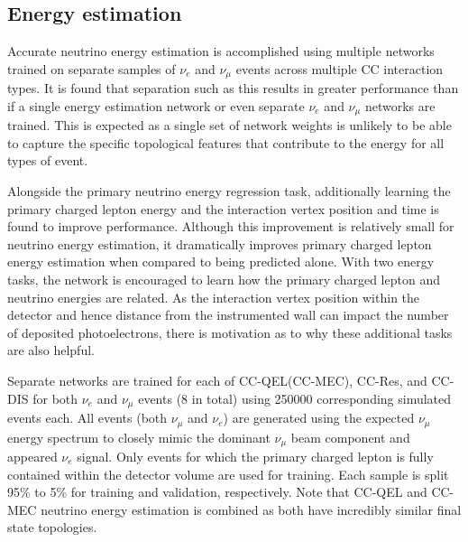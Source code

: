 \subsection{Energy estimation} %
\label{sec:cnn_specific_energy} %

Accurate neutrino energy estimation is accomplished using multiple networks trained on separate
samples of $\nu_{e}$ and $\nu_{\mu}$ events across multiple CC interaction types. It is found that
separation such as this results in greater performance than if a single energy estimation network
or even separate $\nu_{e}$ and $\nu_{\mu}$ networks are trained. This is expected as a single set
of network weights is unlikely to be able to capture the specific topological features that
contribute to the energy for all types of event.

Alongside the primary neutrino energy regression task, additionally learning the primary charged
lepton energy and the interaction vertex position and time is found to improve performance.
Although this improvement is relatively small for neutrino energy estimation, it dramatically
improves primary charged lepton energy estimation when compared to being predicted alone. With two
energy tasks, the network is encouraged to learn how the primary charged lepton and neutrino
energies are related. As the interaction vertex position within the detector and hence distance
from the instrumented wall can impact the number of deposited photoelectrons, there is motivation
as to why these additional tasks are also helpful.

Separate networks are trained for each of CC-QEL(CC-MEC), CC-Res, and CC-DIS for both $\nu_{e}$
and $\nu_{\mu}$ events (8 in total) using 250000 corresponding simulated events each. All events
(both $\nu_{\mu}$ and $\nu_{e}$) are generated using the expected \chips $\nu_{\mu}$ energy
spectrum to closely mimic the dominant $\nu_{\mu}$ beam component and appeared $\nu_{e}$ signal.
Only events for which the primary charged lepton is fully contained within the detector volume are
used for training. Each sample is split 95\% to 5\% for training and validation, respectively.
Note that CC-QEL and CC-MEC neutrino energy estimation is combined as both have incredibly similar
final state topologies.

